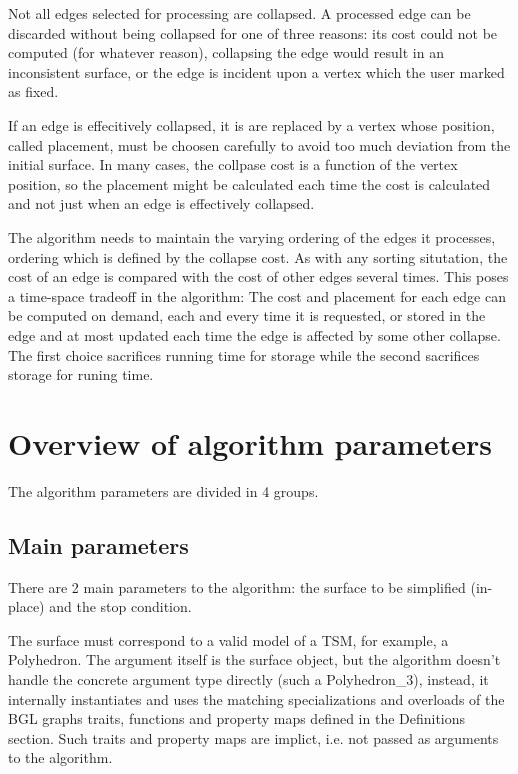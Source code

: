 Not all edges selected for processing are collapsed. A processed edge can be discarded without being collapsed for one of three reasons: its cost could not be computed (for whatever reason), collapsing the edge would result in an inconsistent surface, or the edge is incident upon a vertex which the user marked as fixed.

If an edge is effecitively collapsed, it is are replaced by a vertex whose position, called placement, must be choosen carefully to avoid too much deviation from the initial surface. In many cases, the collpase cost is a function of the vertex position, so the placement might be calculated each time the cost is calculated and not just when an edge is effectively collapsed.

The algorithm needs to maintain the varying ordering of the edges it processes, ordering which is defined by the collapse cost. As with any sorting situtation, the cost of an edge is compared with the cost of other edges several times. This poses a time-space tradeoff in the algorithm: The cost and placement for each edge can be computed on demand, each and every time it is requested, or stored in the edge and at most updated each time the edge is affected by some other collapse. The first choice sacrifices running time for storage while the second sacrifices storage for runing time. 

\section{Overview of algorithm parameters}

The algorithm parameters are divided in 4 groups.

\subsection{Main parameters}

There are 2 main parameters to the algorithm: the surface to be simplified (in-place) and the stop condition.

The surface must correspond to a valid model of a TSM, for example, a Polyhedron. The argument itself is the surface object, but the algorithm doesn't handle the concrete argument type directly (such a Polyhedron_3), instead, it internally instantiates and uses the matching specializations and overloads of the BGL graphs traits, functions and property maps defined in the Definitions section. Such traits and property maps are implict, i.e. not passed as arguments to the algorithm.

